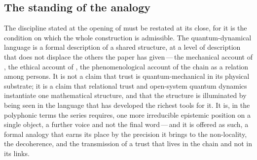 \subsection{The standing of the analogy}
\label{p13:sub:rel-standing}

The discipline stated at the opening of  must be restated at its close, for it is the condition on which the whole construction is admissible. The quantum-dynamical language is a formal description of a shared structure, at a level of description that does not displace the others the paper has given\,---\,the mechanical account of , the ethical account of , the phenomenological account of the chain as a relation among persons. It is not a claim that trust is quantum-mechanical in its physical substrate; it is a claim that relational trust and open-system quantum dynamics instantiate one mathematical structure, and that the structure is illuminated by being seen in the language that has developed the richest tools for it. It is, in the polyphonic terms the series requires, one more irreducible epistemic position on a single object, a further voice and not the final word\,---\,and it is offered as such, a formal analogy that earns its place by the precision it brings to the non-locality, the decoherence, and the transmission of a trust that lives in the chain and not in its links.
